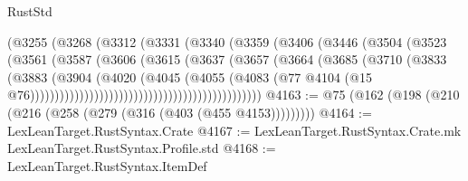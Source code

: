 \begin{lexlean}{RustStd}
\begin{coremodule}
                                          (@3255
                                            (@3268
                                              (@3312
                                                (@3331
                                                  (@3340
                                                    (@3359
                                                      (@3406
                                                        (@3446
                                                          (@3504
                                                            (@3523
                                                              (@3561
                                                                (@3587
                                                                  (@3606
                                                                    (@3615
                                                                      (@3637
                                                                        (@3657
                                                                          (@3664
                                                                            (@3685
                                                                              (@3710
                                                                                (@3833
                                                                                  (@3883
                                                                                    (@3904
                                                                                      (@4020
                                                                                        (@4045
                                                                                          (@4055
                                                                                            (@4083
                                                                                              (@77
                                                                                                @4104
                                                                                                (@15
                                                                                                  @76)))))))))))))))))))))))))))))))))))))))))))))))
@4163 := @75 (@162 (@198 (@210 (@216 (@258 (@279 (@316 (@403 (@455 @4153)))))))))
@4164 := LexLeanTarget.RustSyntax.Crate
@4167 := LexLeanTarget.RustSyntax.Crate.mk LexLeanTarget.RustSyntax.Profile.std
@4168 := LexLeanTarget.RustSyntax.ItemDef

\end{coremodule}
\end{lexlean}
